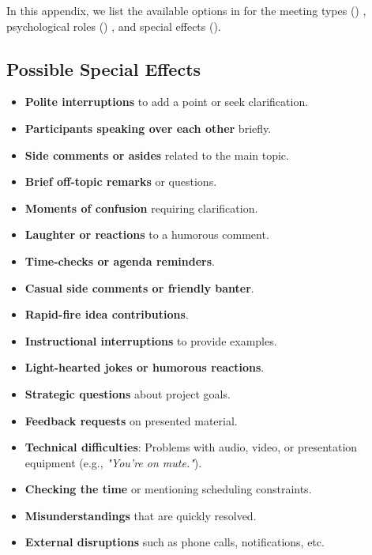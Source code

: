 In this appendix, we list the available options in \pipeline{} for the meeting types () \cite{Osborn53,drucker1967effective,simon2013administrative}, psychological roles () \cite{BenneS48}, and special effects ().





\subsection{Possible Special Effects}
\label{sec:appendix_special effects}
\begin{itemize}[noitemsep, topsep=0pt, leftmargin=*,
    label={\textcolor{black}{\small$\bullet$}}]
    \item \textbf{Polite interruptions} to add a point or seek clarification.
    \item \textbf{Participants speaking over each other} briefly.
    \item \textbf{Side comments or asides} related to the main topic.
    \item \textbf{Brief off-topic remarks} or questions.
    \item \textbf{Moments of confusion} requiring clarification.
    \item \textbf{Laughter or reactions} to a humorous comment.
    \item \textbf{Time-checks or agenda reminders}.
    \item \textbf{Casual side comments or friendly banter}.
    \item \textbf{Rapid-fire idea contributions}.
    \item \textbf{Instructional interruptions} to provide examples.
    \item \textbf{Light-hearted jokes or humorous reactions}.
    \item \textbf{Strategic questions} about project goals.
    \item \textbf{Feedback requests} on presented material.
    \item \textbf{Technical difficulties}: Problems with audio, video, or presentation equipment (e.g., \textit{"You're on mute."}).
    \item \textbf{Checking the time} or mentioning scheduling constraints.
    \item \textbf{Misunderstandings} that are quickly resolved.
    \item \textbf{External disruptions} such as phone calls, notifications, etc.
\end{itemize}



